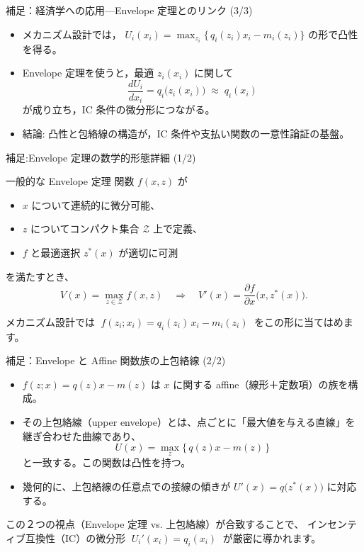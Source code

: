 \documentclass[dvipdfmx,autodetect-engine]{beamer}
\begin{document}
\begin{frame}{補足：経済学への応用—Envelope 定理とのリンク (3/3)}
  \begin{itemize}
    \item メカニズム設計では，
      \(\displaystyle U_i(x_i)=\max_{z_i}\{\,q_i(z_i)x_i - m_i(z_i)\}\)
      の形で凸性を得る。
    \item Envelope 定理を使うと，最適 \(z_i(x_i)\) に関して
      \[
        \frac{dU_i}{dx_i} = q_i\bigl(z_i(x_i)\bigr)
        \;\approx\; q_i(x_i)
      \]
      が成り立ち，IC 条件の微分形につながる。
    \item 結論: 凸性と包絡線の構造が，IC 条件や支払い関数の一意性論証の基盤。
  \end{itemize}
\end{frame}

\begin{frame}{補足:Envelope 定理の数学的形態詳細 (1/2)}
  \begin{block}{一般的な Envelope 定理}
    関数 \(f(x,z)\) が
    \begin{itemize}
      \item \(x\) について連続的に微分可能、
      \item \(z\) についてコンパクト集合 \(\mathcal Z\) 上で定義、
      \item \(f\) と最適選択 \(z^*(x)\) が適切に可測
    \end{itemize}
    を満たすとき、
    \[
      V(x)=\max_{z\in\mathcal Z}f(x,z)
      \quad\Longrightarrow\quad
      V'(x)=\frac{\partial f}{\partial x}\bigl(x,z^*(x)\bigr).
    \]
  \end{block}
  \vspace{1ex}
  メカニズム設計では
  \(\;f(z_i;x_i)=q_i(z_i)\,x_i - m_i(z_i)\;\)
  をこの形に当てはめます。
\end{frame}


\begin{frame}{補足：Envelope と Affine 関数族の上包絡線 (2/2)}
  \begin{itemize}
    \item \(f(z;x)=q(z)x - m(z)\) は \(x\) に関する affine（線形＋定数項）の族を構成。
    \item その上包絡線（upper envelope）とは、点ごとに「最大値を与える直線」を継ぎ合わせた曲線であり、
      \[
        U(x)=\max_z\{\,q(z)x - m(z)\,\}
      \]
      と一致する。この関数は凸性を持つ。
    \item 幾何的に、上包絡線の任意点での接線の傾きが
      \(\displaystyle U'(x)=q\bigl(z^*(x)\bigr)\)
      に対応する。
  \end{itemize}
  \vspace{1ex}
  この２つの視点（Envelope 定理 vs. 上包絡線）が合致することで、
  インセンティブ互換性（IC）の微分形
  \(\;U_i'(x_i)=q_i(x_i)\;\)
  が厳密に導かれます。
\end{frame}
\end{document}
